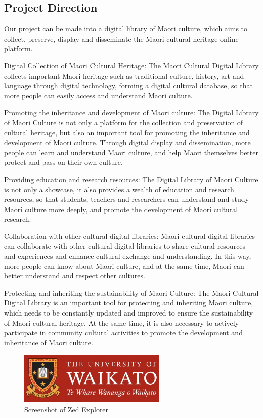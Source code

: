 \subsection{Project Direction}
Our project can be made into a digital library of Maori culture, which aims to collect, preserve, display and disseminate the Maori cultural heritage online platform.

Digital Collection of Maori Cultural Heritage: The Maori Cultural Digital Library collects important Maori heritage such as traditional culture, history, art and language through digital technology, forming a digital cultural database, so that more people can easily access and understand Maori culture.

Promoting the inheritance and development of Maori culture: The Digital Library of Maori Culture is not only a platform for the collection and preservation of cultural heritage, but also an important tool for promoting the inheritance and development of Maori culture. Through digital display and dissemination, more people can learn and understand Maori culture, and help Maori themselves better protect and pass on their own culture.

Providing education and research resources: The Digital Library of Maori Culture is not only a showcase, it also provides a wealth of education and research resources, so that students, teachers and researchers can understand and study Maori culture more deeply, and promote the development of Maori cultural research.

Collaboration with other cultural digital libraries: Maori cultural digital libraries can collaborate with other cultural digital libraries to share cultural resources and experiences and enhance cultural exchange and understanding. In this way, more people can know about Maori culture, and at the same time, Maori can better understand and respect other cultures.

Protecting and inheriting the sustainability of Maori Culture: The Maori Cultural Digital Library is an important tool for protecting and inheriting Maori culture, which needs to be constantly updated and improved to ensure the sustainability of Maori cultural heritage. At the same time, it is also necessary to actively participate in community cultural activities to promote the development and inheritance of Maori culture. 
 
 
 
 
 
 
 
\begin{figure}[htbp]
  \centerline{\includegraphics[width=200pt]{images/UoW.jpg}}
  \caption{Screenshot of Zed Explorer }
  \label{zede}
\end{figure} 

